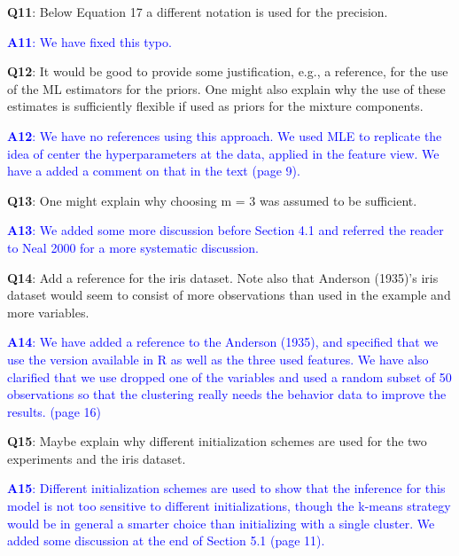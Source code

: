 \documentclass[]{article}
\begin{document}
	\vspace{3mm}
	\textbf{Q11}:  Below Equation 17 a different notation is used for the precision.

	\textcolor{blue}{  
	\textbf{A11}: We have fixed this typo.
	} 

	
	\vspace{3mm}
	\textbf{Q12}: It would be good to provide some justification, e.g., a reference, for the use of the ML estimators for the priors. One might also explain why the use of these estimates is sufficiently flexible if used as priors for the mixture components.

	\textcolor{blue}{  
	\textbf{A12}: We have no references using this approach.  We used MLE to replicate the idea of center the hyperparameters at the data, applied in the feature view.  We have a added a comment on that in the text (page 9).
	} 
	
	\vspace{3mm}
	\textbf{Q13}:  One might explain why choosing m = 3 was assumed to be sufficient.

	\textcolor{blue}{  
	\textbf{A13}: We added some more discussion before Section 4.1 and referred the reader to Neal 2000 for a more systematic discussion. 
	} 

	
	\vspace{3mm}
	\textbf{Q14}:  Add a reference for the iris dataset. Note also that Anderson (1935)'s iris dataset would seem to consist of more observations than used in the example and more variables.

	\textcolor{blue}{  
	\textbf{A14}: We have added a reference to the Anderson (1935), and specified that we use the version available in R as well as the three used features. We have also clarified that we use dropped one of the variables and used a random subset of 50 observations so that the clustering really needs the behavior data to improve the results.  (page 16)
	} 
	
	\vspace{3mm}
	\textbf{Q15}: Maybe explain why different initialization schemes are used for the two experiments and the iris dataset.

	\textcolor{blue}{  
	\textbf{A15}: Different initialization schemes are used to show that the inference for this model is not too sensitive to different initializations, though the k-means strategy would be in general a smarter choice than initializing with a single cluster. We added some discussion at the end of Section 5.1 (page 11).
	} 
\end{document}
